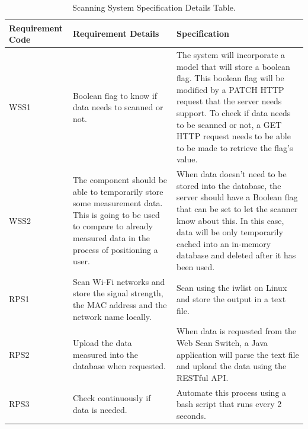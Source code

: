 \setlength\tabcolsep{4pt}
\begin{longtable}[c]{| p{2cm} | p{5cm} | p{5cm} |}
\caption{Scanning System Specification Details Table.\label{long}}\\
 
\hline
Requirement Code & Requirement Details & Specification \\
\hline 
\endhead

\hline
\endlastfoot

WSS1 & Boolean flag to know if data needs to scanned or not. & The system will incorporate a model that will store a boolean flag. This boolean flag will be modified by a PATCH HTTP request that the server needs support. To check if data needs to be scanned or not, a GET HTTP request needs to be able to be made to retrieve the flag's value.\\
\hline
WSS2 & The component should be able to temporarily store some measurement data. This is going to be used to compare to already measured data in the process of positioning a user. & When data doesn't need to be stored into the database, the server should have a Boolean flag that can be set to let the scanner know about this. In this case, data will be only temporarily cached into an in-memory database and deleted after it has been used.\\
\hline
RPS1 & Scan Wi-Fi networks and store the signal strength, the MAC address and the network name locally. & Scan using the iwlist on Linux and store the output in a text file.\\
\hline
RPS2 & Upload the data measured into the database when requested. & When data is requested from the Web Scan Switch, a Java application will parse the text file and upload the data using the RESTful API.\\
\hline
RPS3 & Check continuously if data is needed. & Automate this process using a bash script that runs every 2 seconds.\\
\hline
\end{longtable}

